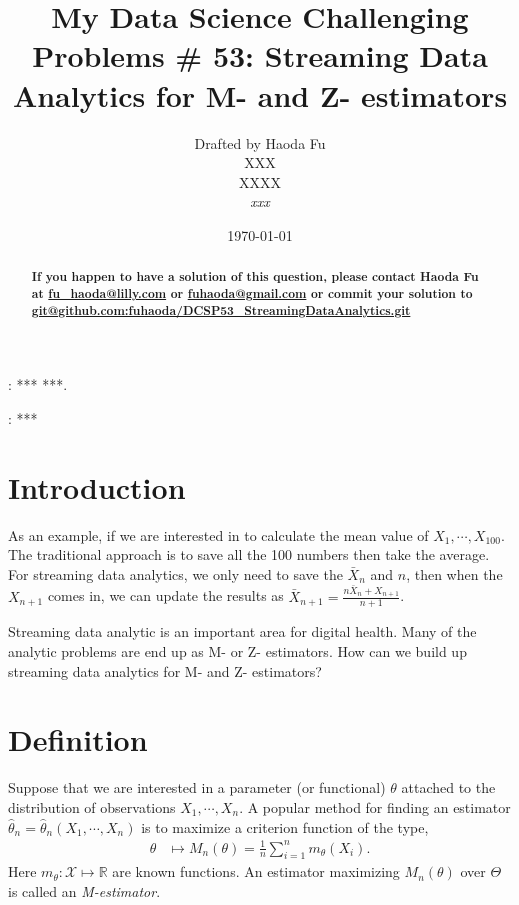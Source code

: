 \documentclass[12pt]{article}
\def\hat{\widehat}
\def\cal{\mathcal}
\def\calX{{\cal X}} %
\def\bbR{{\mathbb{R}}} %
\begin{document}
\title
{\bf My Data Science Challenging Problems \# 53: Streaming Data Analytics for M- and Z- estimators}
\author
{
Drafted by Haoda Fu\\
XXX \\
XXXX \\
\textsl{xxx} }
\date{\today}

\maketitle
\begin{abstract}
\textbf{{\color[rgb]{1,0,0} If you happen to have a solution of this question, please contact Haoda Fu at \href{mailto:fu\_haoda@lilly.com }{fu\_haoda@lilly.com} or  \href{mailto:ffuhaoda@gmail.com}{fuhaoda@gmail.com}  or commit your solution to \url{git@github.com:fuhaoda/DCSP53_StreamingDataAnalytics.git} }
}

\end{abstract}

: *** ***.

: ***
\section{Introduction}
As an example, if we are interested in to calculate the mean value of $X_1,\cdots, X_{100}$.
The traditional approach is to save all the 100 numbers then take the average. For streaming data analytics, we only need to save the $\bar{X}_n$ and $n$, then when the $X_{n+1}$ comes in, we can update the results as $\bar{X}_{n+1} = \frac{n \bar{X}_n + X_{n+1}}{n+1}$.

Streaming data analytic is an important area for digital health. Many of the analytic problems are end up as M- or Z- estimators. How can we build up streaming data analytics for M- and Z- estimators?

\section{Definition}
Suppose that we are interested in a parameter (or functional) $\theta$ attached to the distribution of observations $X_1,\cdots, X_n$. A popular method for finding an estimator $\hat{\theta}_n = \hat{\theta}_n(X_1,\cdots, X_n)$ is to maximize a criterion function of the type,
\begin{align*}
\theta & \mapsto M_n(\theta) = \frac{1}{n} \sum_{i=1}^n m_{\theta} (X_i).
\end{align*} 
Here $m_{\theta} : \calX \mapsto \bbR$ are known functions. An estimator maximizing $M_n(\theta)$ over $\Theta$ is called an \emph{M-estimator}. 
\end{document}
